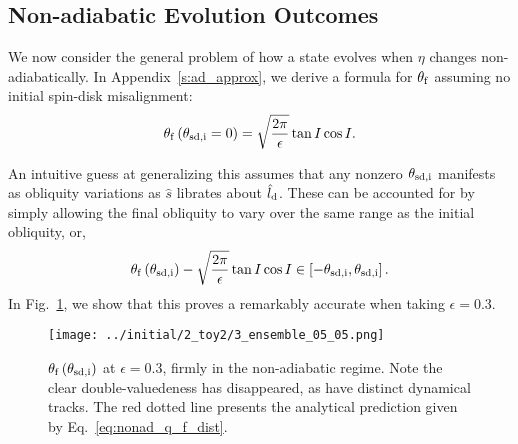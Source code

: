 \documentclass[
        fleqn,
        usenatbib,
        referee,
    ]{mnras}
\newcommand*{\p}[1]{\left(#1\right)}
\newcommand*{\s}[1]{\left[#1\right]}
\begin{document}
\subsection{Non-adiabatic Evolution Outcomes}

We now consider the general problem of how a state evolves when $\eta$ changes
non-adiabatically. In Appendix~\ref{s:ad_approx}, we derive a formula for
$\theta_{\rm f}$ assuming no initial spin-disk misalignment:
\begin{equation}
    \theta_{\rm f}\p{\theta_{\rm sd, i} = 0} = \sqrt{\frac{2\pi}{\epsilon}} \tan
        I\cos I.\label{eq:nonad_q_f}
\end{equation}

An intuitive guess at generalizing this assumes that any nonzero $\theta_{\rm
sd, i}$ manifests as obliquity variations as $\hat{s}$ librates about
$\hat{l}_{\rm d}$. These can be accounted for by simply allowing the final
obliquity to vary over the same range as the initial obliquity, or,
\begin{equation}
    \theta_{\rm f}\p{\theta_{\rm sd, i}} - \sqrt{\frac{2\pi}{\epsilon}} \tan
        I\cos I\in \s{-\theta_{\rm sd, i}, \theta_{\rm sd,i}}
        .\label{eq:nonad_q_f_dist}
\end{equation}
In Fig.~\ref{fig:nonad_3_ensemeble}, we show that this proves a remarkably
accurate when taking $\epsilon = 0.3$.
\begin{figure}
    \centering
    \texttt{[image: ../initial/2\_toy2/3\_ensemble\_05\_05.png]}
    \caption{$\theta_{\rm  f}\p{\theta_{\rm sd, i}}$ at $\epsilon = 0.3$, firmly
    in the non-adiabatic regime. Note the clear double-valuedeness has
    disappeared, as have distinct dynamical tracks. The red dotted line presents
    the analytical prediction given by
    Eq.~\eqref{eq:nonad_q_f_dist}.}\label{fig:nonad_3_ensemeble}
\end{figure}
\end{document}
